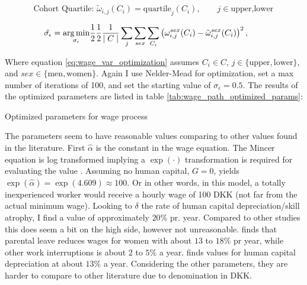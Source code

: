 \begin{equation}
    \text{Cohort Quartile: } {\tilde{\omega}}_{i, j} (C_i) = \text{quartile}_j (C_i), \qquad j\in{\text{upper}, \text{lower}} 
\end{equation}

\begin{equation}\label{eq:wage_var_optimization}
   \hat{\sigma_\epsilon}  = \underset{\sigma_\epsilon}{\operatorname*{arg\,min}} \frac{1}{2}\frac{1}{2}\frac{1}{\mid C \mid } \sum_{j} \sum_{sex}\sum_{C_i} \left( \omega_{i, j}^{sex}(C_i)  - \tilde{\omega}_{i,j}^{sex}(C_i)\right)^2, \qquad 
\end{equation}

Where equation \eqref{eq:wage_var_optimization} assumes $C_i \in C$, $j \in \{\text{upper},  \text{lower} \}$, and $sex \in \{\text{men}, \text{women} \}$. Again I use Nelder-Mead for optimization, set a max number of iterations of 100, and set the starting value of $\sigma_\epsilon = 0.5$. The results of the optimized parameters are listed in table \ref{tab:wage_path_optimized_params}:

\begin{table}[ht]
    \centering
    
    \caption{Optimized parameters for wage process}
    \label{tab:wage_path_optimized_params}
\end{table}

The parameters seem to have reasonable values comparing to other values found in the literature. First $\hat{\alpha} $ is the constant in the wage equation.
The Mincer equation is log transformed implying a $\exp (\cdot)$ transformation is required for evaluating the value . 
Assuming no human capital, $G=0$, yields $\exp (\hat{\alpha}) = \exp ( 4.609 ) \approx 100$. 
Or in other words, in this model, a totally inexperienced worker would receive a hourly wage of 100 DKK (not far from the actual minimum wage). 
Looking to $\delta$ the rate of human capital depreciation/skill atrophy, I find a value of approximately $20 \%$ pr. year. Compared to other studies this does seem a bit on the high side, however not unreasonable. \textcite{kunze_timing_2002} finds that parental leave reduces wages for women with about $13$ to $18 \%$ pr year, while other work interruptions is about $2$  to $5 \%$ a year. \textcite{light_early-career_1995} finds values for human capital depreciation at about $13 \%$ a year. Considering the other parameters, they are harder to compare to other literature due to denomination in DKK. 



